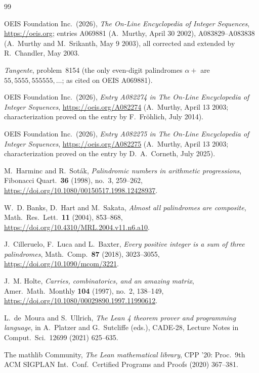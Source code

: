 \documentclass[12pt]{article}
\begin{document}
\begin{thebibliography}{99}

OEIS Foundation Inc.~(2026), \emph{The On-Line
Encyclopedia of Integer Sequences},
\url{https://oeis.org}; entries A069881 (A.~Murthy,
April 30 2002), A083829--A083838 (A.~Murthy and
M.~Srikanth, May 9 2003), all corrected and extended by
R.~Chandler, May 2003.

\emph{Tangente}, problem~8154 (the only even-digit
palindromes $\alpha+$ are $55, 5555, 555555, \ldots$;
as cited on OEIS A069881).

OEIS Foundation Inc.~(2026), \emph{Entry A082274 in The
On-Line Encyclopedia of Integer Sequences},
\url{https://oeis.org/A082274} (A.~Murthy, April 13
2003; characterization proved on the entry by
F.~Fr\"ohlich, July 2014).

OEIS Foundation Inc.~(2026), \emph{Entry A082275 in The
On-Line Encyclopedia of Integer Sequences},
\url{https://oeis.org/A082275} (A.~Murthy, April 13
2003; characterization proved on the entry by
D.~A.~Corneth, July 2025).

M.~Harminc and R.~Sot\'ak, \emph{Palindromic numbers in
arithmetic progressions}, Fibonacci Quart.\ \textbf{36}
(1998), no.~3, 259--262,
\url{https://doi.org/10.1080/00150517.1998.12428937}.

W.~D. Banks, D.~Hart and M.~Sakata, \emph{Almost all
palindromes are composite}, Math.\ Res.\ Lett.\
\textbf{11} (2004), 853--868,
\url{https://doi.org/10.4310/MRL.2004.v11.n6.a10}.

J.~Cilleruelo, F.~Luca and L.~Baxter, \emph{Every
positive integer is a sum of three palindromes}, Math.\
Comp.\ \textbf{87} (2018), 3023--3055,
\url{https://doi.org/10.1090/mcom/3221}.

J.~M. Holte, \emph{Carries, combinatorics, and an
amazing matrix}, Amer.\ Math.\ Monthly \textbf{104}
(1997), no.~2, 138--149,
\url{https://doi.org/10.1080/00029890.1997.11990612}.

L.~de~Moura and S.~Ullrich, \emph{The Lean 4 theorem
prover and programming language}, in A.~Platzer and
G.~Sutcliffe (eds.), CADE-28, Lecture Notes in
Comput.\ Sci.\ 12699 (2021) 625--635.

The mathlib Community, \emph{The Lean mathematical
library}, CPP '20: Proc.\ 9th ACM SIGPLAN Int.\ Conf.\
Certified Programs and Proofs (2020) 367--381.


\end{thebibliography}
\end{document}
